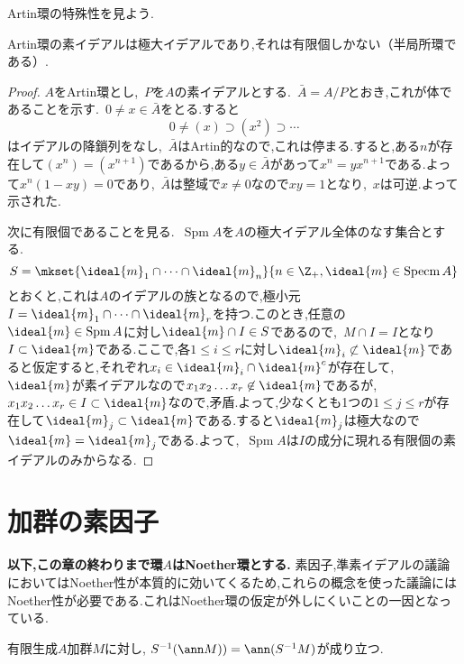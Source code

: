 Artin環の特殊性を見よう.
\begin{prop}\label{prop:Artinの素イデアル}
	Artin環の素イデアルは極大イデアルであり,それは有限個しかない（半局所環である）.
\end{prop}
\begin{proof}
	$A$をArtin環とし,~$ P$を$A$の素イデアルとする.~$\bar{A}=A/ P$とおき,これが体であることを示す.~$0\neq x\in\bar{A}$をとる.すると
	\[0\neq(x)\supset(x^2)\supset\cdots\]
	はイデアルの降鎖列をなし,~$\bar{A}$はArtin的なので,これは停まる.すると,ある$n$が存在して$(x^n)=(x^{n+1})$であるから,ある$y\in\bar{A}$があって$x^n=yx^{n+1}$である.よって$x^n(1-xy)=0$であり,~$\bar{A}$は整域で$x\neq0$なので$xy=1$となり,~$x$は可逆.よって示された.
	
	次に有限個であることを見る.~$\operatorname{Spm}A$を$A$の極大イデアル全体のなす集合とする.
	\[S=\mkset{\ideal{m}_1\cap\dots\cap\ideal{m}_n}{n\in\Z_+,\ideal{m}\in\operatorname{Specm}A}\]
	とおくと,これは$A$のイデアルの族となるので,極小元$I=\ideal{m}_1\cap\dots\cap\ideal{m}_r$を持つ.このとき,任意の$\ideal{m}\in\operatorname{Spm}A$に対し$\ideal{m}\cap I\in S$であるので,~$M\cap I=I$となり$I\subset\ideal{m}$である.ここで,各$1\leq i\leq r$に対し$\ideal{m}_i\not\subset\ideal{m}$であると仮定すると,それぞれ$x_i\in\ideal{m}_i\cap\ideal{m}^c$が存在して,~$\ideal{m}$が素イデアルなので$x_1x_2\dots x_r\not\in\ideal{m}$であるが,~$x_1x_2\dots x_r\in I\subset\ideal{m}$なので,矛盾.よって,少なくとも1つの$1\leq j\leq r$が存在して$\ideal{m}_j\subset\ideal{m}$である.すると$\ideal{m}_j$は極大なので$\ideal{m}=\ideal{m}_j$である.よって,~$\operatorname{Spm}A$は$I$の成分に現れる有限個の素イデアルのみからなる.
\end{proof}

\section{加群の素因子}

\textbf{以下,この章の終わりまで環$A$はNoether環とする.} 素因子,準素イデアルの議論においてはNoether性が本質的に効いてくるため,これらの概念を使った議論にはNoether性が必要である.これはNoether環の仮定が外しにくいことの一因となっている.

\begin{lem}
	有限生成$A$加群$M$に対し, $S^{-1}(\ann M))=\ann(S^{-1}M)$が成り立つ. 
\end{lem}

